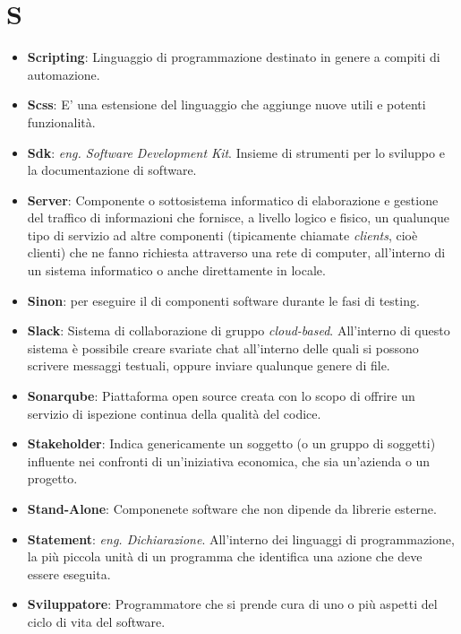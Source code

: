 \section*{S}
\begin{itemize}
	\item
	\textbf{Scripting}: Linguaggio di programmazione destinato in genere a compiti di automazione.
	\item
	\textbf{Scss}: E' una estensione del linguaggio  che aggiunge nuove utili e potenti funzionalità.
	\item
	\textbf{Sdk}: \textit{eng. Software Development Kit}. Insieme di strumenti per lo sviluppo e la documentazione di software.
	\item
	\textbf{Server}: Componente o sottosistema informatico di elaborazione e gestione del traffico di informazioni che fornisce, a livello logico e fisico, un qualunque tipo di servizio ad altre componenti (tipicamente chiamate \textit{clients}, cioè clienti) che ne fanno richiesta attraverso una rete di computer, all'interno di un sistema informatico o anche direttamente in locale.
	\item
	\textbf{Sinon}:  per eseguire il  di componenti software durante le fasi di testing.
	\item
	\textbf{Slack}: Sistema di collaborazione di gruppo \textit{cloud-based}. All'interno di questo sistema è possibile creare svariate chat all'interno delle quali si possono scrivere messaggi testuali, oppure inviare qualunque genere di file.
	\item
	\textbf{Sonarqube}: Piattaforma open source creata con lo scopo di offrire un servizio di ispezione continua della qualità del codice.
	\item
	\textbf{Stakeholder}: Indica genericamente un soggetto (o un gruppo di soggetti) influente nei confronti di un'iniziativa economica, che sia un'azienda o un progetto.
	\item
	\textbf{Stand-Alone}: Componenete software che non dipende da librerie esterne.
	\item
	\textbf{Statement}: \textit{eng. Dichiarazione}. All'interno dei linguaggi di programmazione, la più piccola unità di un programma che identifica una azione che deve essere eseguita.
	\item
	\textbf{Sviluppatore}: Programmatore che si prende cura di uno o più aspetti del ciclo di vita del software.
\end{itemize}
\newpage